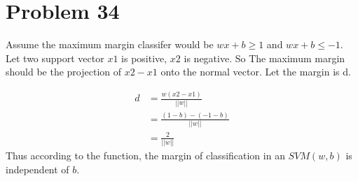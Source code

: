 \documentclass[12pt]{article}
\begin{document}
\section{Problem 34}
Assume the maximum margin classifer would be $wx + b \geq 1$ and $wx + b \leq -1$. Let two support vector $x1$ is positive, $x2$ is negative. So The maximum margin should be the projection of $x2 - x1$ onto the normal vector. Let the margin is d.

\begin{align*}
		d &= \frac{w(x2 - x1)}{||w||} \\
		&= \frac{(1 - b)- (-1 - b)}{||w||} \\
		&= \frac{2}{||w||}
\end{align*}
Thus according to the function, the margin of classification in an $SVM(w,b)$ is independent of $b$.

\end{document}

